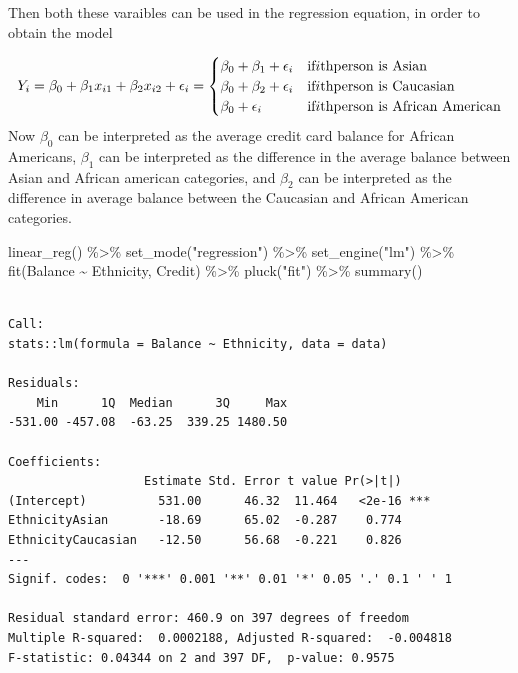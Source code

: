 \documentclass[
  letterpaper,
  DIV=11,
  numbers=noendperiod]{scrreprt}
\newenvironment{Shaded}{\begin{snugshade}}{\end{snugshade}}
\newcommand{\FunctionTok}[1]{\textcolor[rgb]{0.02,0.16,0.49}{#1}}
\newcommand{\NormalTok}[1]{\textcolor[rgb]{0.33,0.33,0.33}{#1}}
\newcommand{\SpecialCharTok}[1]{\textcolor[rgb]{0.00,0.46,0.62}{#1}}
\newcommand{\StringTok}[1]{\textcolor[rgb]{0.00,0.50,0.00}{#1}}
\begin{document}
Then both these varaibles can be used in the regression equation, in
order to obtain the model

\[
Y_i = \beta_0 + \beta_1x_{i1} + \beta_2x_{i2} + \epsilon_i = 
\begin{cases}
\beta_0 + \beta_1 + \epsilon_i & \text{if}\space i\text{th}\space \text{person is Asian} \\
\beta_0 + \beta_2 + \epsilon_i & \text{if}\space i\text{th}\space \text{person is Caucasian} \\
\beta_0 + \epsilon_i & \text{if}\space i\text{th}\space \text{person is African American} 
\end{cases}
\] Now \(\beta_0\) can be interpreted as the average credit card balance
for African Americans, \(\beta_1\) can be interpreted as the difference
in the average balance between Asian and African american categories,
and \(\beta_2\) can be interpreted as the difference in average balance
between the Caucasian and African American categories.

\begin{Shaded}
\begin{Highlighting}[]
\FunctionTok{linear\_reg}\NormalTok{() }\SpecialCharTok{\%\textgreater{}\%} 
  \FunctionTok{set\_mode}\NormalTok{(}\StringTok{"regression"}\NormalTok{) }\SpecialCharTok{\%\textgreater{}\%} 
  \FunctionTok{set\_engine}\NormalTok{(}\StringTok{"lm"}\NormalTok{) }\SpecialCharTok{\%\textgreater{}\%} 
  \FunctionTok{fit}\NormalTok{(Balance }\SpecialCharTok{\textasciitilde{}}\NormalTok{ Ethnicity, Credit) }\SpecialCharTok{\%\textgreater{}\%} 
  \FunctionTok{pluck}\NormalTok{(}\StringTok{"fit"}\NormalTok{) }\SpecialCharTok{\%\textgreater{}\%} 
  \FunctionTok{summary}\NormalTok{()}
\end{Highlighting}
\end{Shaded}

\begin{verbatim}

Call:
stats::lm(formula = Balance ~ Ethnicity, data = data)

Residuals:
    Min      1Q  Median      3Q     Max 
-531.00 -457.08  -63.25  339.25 1480.50 

Coefficients:
                   Estimate Std. Error t value Pr(>|t|)    
(Intercept)          531.00      46.32  11.464   <2e-16 ***
EthnicityAsian       -18.69      65.02  -0.287    0.774    
EthnicityCaucasian   -12.50      56.68  -0.221    0.826    
---
Signif. codes:  0 '***' 0.001 '**' 0.01 '*' 0.05 '.' 0.1 ' ' 1

Residual standard error: 460.9 on 397 degrees of freedom
Multiple R-squared:  0.0002188, Adjusted R-squared:  -0.004818 
F-statistic: 0.04344 on 2 and 397 DF,  p-value: 0.9575
\end{verbatim}
\end{document}
